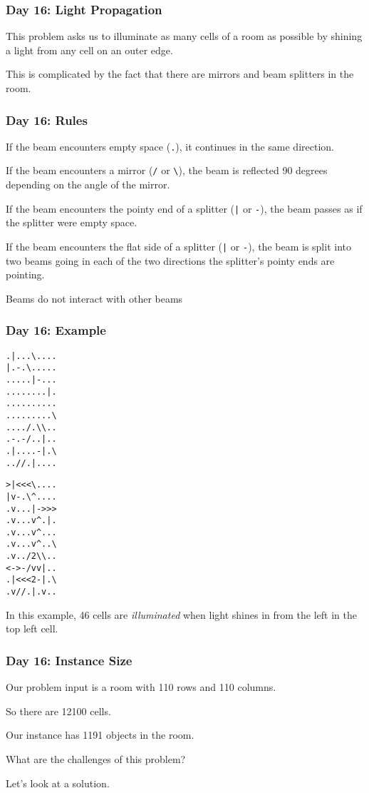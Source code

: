 \begin{frame}
\frametitle{Day 16: Light Propagation}
This problem asks us to illuminate as many cells of a room as possible by
shining a light from any cell on an outer edge.\vspace{3em}

This is complicated by the fact that there are mirrors and beam splitters
in the room.
\end{frame}

\begin{frame}[fragile]
\frametitle{Day 16: Rules}
If the beam encounters empty space (\verb!.!), it continues in the same direction.\vfill

If the beam encounters a mirror (\verb!/! or \verb!\!), the beam is reflected 90 degrees depending on the angle of the mirror.\vfill

If the beam encounters the pointy end of a splitter (\verb!|! or \verb!-!), the beam passes as if the splitter were empty space.\vfill

If the beam encounters the flat side of a splitter (\verb!|! or \verb!-!), the beam is split into two beams going in each of the two directions the splitter's pointy ends are pointing.\vfill

Beams do not interact with other beams
\end{frame}

\begin{frame}[fragile]
\frametitle{Day 16: Example}

\begin{center}
\begin{minipage}{0.45\textwidth}
\begin{center}
\begin{verbatim}
.|...\....
|.-.\.....
.....|-...
........|.
..........
.........\
..../.\\..
.-.-/..|..
.|....-|.\
..//.|....
\end{verbatim}
\end{center}
\end{minipage}
\begin{minipage}{0.45\textwidth}
\begin{center}
\begin{verbatim}
>|<<<\....
|v-.\^....
.v...|->>>
.v...v^.|.
.v...v^...
.v...v^..\
.v../2\\..
<->-/vv|..
.|<<<2-|.\
.v//.|.v..
\end{verbatim}
\end{center}
\end{minipage}
\end{center}
\vfill

In this example, 46 cells are {\it illuminated} when light shines in from the left in the top left cell.
\end{frame}

\begin{frame}
\frametitle{Day 16: Instance Size}

Our problem input is a room with 110 rows and 110 columns.\vfill

So there are 12100 cells.\vfill

Our instance has 1191 objects in the room.\vfill

What are the challenges of this problem?\vfill

Let's look at a solution.
\end{frame}
